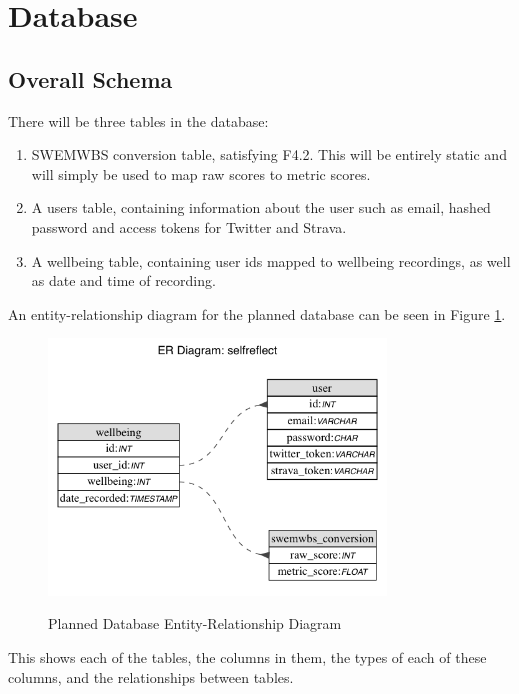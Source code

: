 \documentclass[11pt,openright,a4paper]{report}
\begin{document}
\section{Database} \label{sec:databasedesign}
\subsection{Overall Schema}
There will be three tables in the database:
\begin{enumerate}
\item SWEMWBS conversion table, satisfying F4.2. This will be entirely static and will simply be used to map raw scores to metric scores.
\item A users table, containing information about the user such as email, hashed password and access tokens for Twitter and Strava.
\item A wellbeing table, containing user ids mapped to wellbeing recordings, as well as date and time of recording.
\end{enumerate}

An entity-relationship diagram for the planned database can be seen in Figure \ref{fig:dberd}.

\begin{figure}[ht]
\centering
\caption{Planned Database Entity-Relationship Diagram}
\includegraphics[width=0.8\textwidth]{i/selfreflectdb.png}
\label{fig:dberd}
\end{figure}

\newpage
This shows each of the tables, the columns in them, the types of each of these columns, and the relationships between tables.
\end{document}
